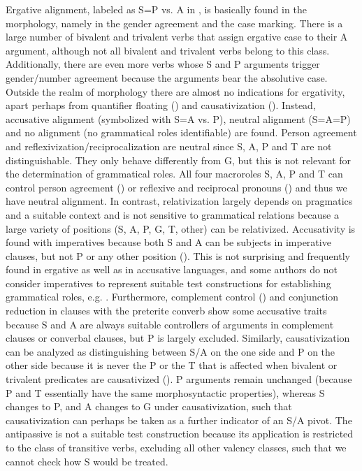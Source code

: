 Ergative alignment, labeled as S=P vs. A in , is basically found in the morphology, namely in the gender agreement and the case marking. There is a large number of bivalent and trivalent verbs that assign ergative case to their A argument, although not all bivalent and trivalent verbs belong to this class. Additionally, there are even more verbs whose S and P arguments trigger gender/number agreement because the arguments bear the absolutive case. Outside the realm of morphology there are almost no indications for ergativity, apart perhaps from quantifier floating () and causativization (). Instead, accusative alignment (symbolized with S=A vs. P), neutral alignment (S=A=P) and no alignment (no grammatical roles identifiable) are found. Person agreement and reflexivization\slash reciprocalization are neutral since S, A, P and T are not distinguishable. They only behave differently from G, but this is not relevant for the determination of grammatical roles. All four macroroles S, A, P and T can control person agreement () or reflexive and reciprocal pronouns () and thus we have neutral alignment. In contrast, relativization largely depends on pragmatics and a suitable context and is not sensitive to grammatical relations because a large variety of positions (S, A, P, G, T, other) can be relativized. Accusativity is found with imperatives because both S and A can be subjects in imperative clauses, but not P or any other position (). This is not surprising and frequently found in ergative as well as in accusative languages, and some authors do not consider imperatives to represent suitable test constructions for establishing grammatical roles, e.g. \citet[131]{Dixon1994}. Furthermore, complement control () and conjunction reduction in clauses with the preterite converb show some accusative traits because S and A are always suitable controllers of arguments in complement clauses or converbal clauses, but P is largely excluded. Similarly, causativization can be analyzed as distinguishing between S/A on the one side and P on the other side because it is never the P or the T that is affected when bivalent or trivalent predicates are causativized (). P arguments remain unchanged (because P and T essentially have the same morphosyntactic properties), whereas S changes to P, and A changes to G under causativization, such that causativization can perhaps be taken as a further indicator of an S/A pivot. The antipassive is not a suitable test construction because its application is restricted to the class of transitive verbs, excluding all other valency classes, such that we cannot check how S would be treated.

